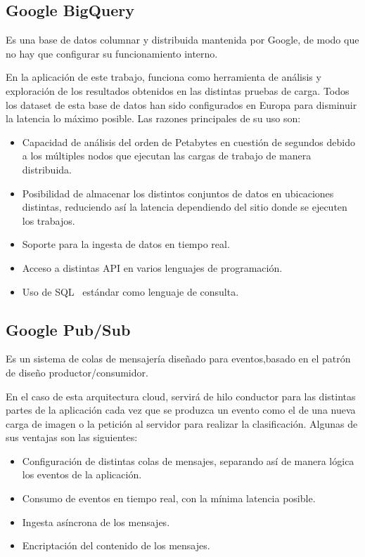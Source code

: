 \subsection{Google BigQuery}\label{subsec:bigquery}
Es una base de datos columnar y distribuida mantenida por Google, de modo que no hay que configurar su funcionamiento interno.

En la aplicación de este trabajo,  funciona como herramienta de análisis y exploración de los resultados obtenidos en las distintas pruebas de carga.
Todos los dataset de esta base de datos han sido configurados en Europa para disminuir la latencia lo máximo posible.
Las razones principales de su uso son:
\begin{itemize}
    \item Capacidad de análisis del orden de Petabytes en cuestión de segundos debido a los múltiples nodos que ejecutan las cargas de trabajo de manera distribuida.
    \item Posibilidad de almacenar los distintos conjuntos de datos en ubicaciones distintas, reduciendo así la latencia dependiendo del sitio donde se ejecuten los trabajos.
    \item Soporte para la ingesta de datos en tiempo real.
    \item Acceso a distintas API en varios lenguajes de programación.
    \item Uso de SQL~\cite{sql} estándar como lenguaje de consulta.
\end{itemize}

\subsection{Google Pub/Sub}\label{subsec:pubsub}
Es un sistema de colas de mensajería diseñado para eventos,basado en el patrón de diseño productor/consumidor.

En el caso de esta arquitectura cloud, servirá de hilo conductor para las distintas partes de la aplicación cada vez que se produzca un evento como el de una nueva carga de imagen o la petición al servidor para realizar la clasificación.
Algunas de sus ventajas son las siguientes:

\begin{itemize}
    \item Configuración de distintas colas de mensajes, separando así de manera lógica los eventos de la aplicación.
    \item Consumo de eventos en tiempo real, con la mínima latencia posible.
    \item Ingesta asíncrona de los mensajes.
    \item Encriptación del contenido de los mensajes.
\end{itemize}

